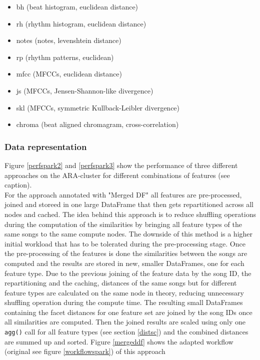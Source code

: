 \begin{itemize}
	\setlength\itemsep{-0.5em}
	\item bh (beat histogram, euclidean distance)
	\item rh (rhythm histogram, euclidean distance)
	\item notes (notes, levenshtein distance)
	\item rp (rhythm patterns, euclidean)
	\item mfcc (MFCCs, euclidean distance)
	\item js (MFCCs, Jensen-Shannon-like divergence)
	\item skl (MFCCs, symmetric Kullback-Leibler divergence)
	\item chroma (beat aligned chromagram, cross-correlation)
\end{itemize}

\subsubsection{Data representation}

Figure \ref {perfspark2} and \ref{perfspark3} show the performance of three different approaches on the ARA-cluster for different combinations of features (see caption).\\
For the approach annotated with "Merged DF" all features are pre-processed, joined and storeed in one large DataFrame that then gets repartitioned across all nodes and cached. The idea behind this approach is to reduce shuffling operations during the computation of the similarities by bringing all feature types of the same songs to the same compute nodes. The downside of this method is a higher initial workload that has to be tolerated during the pre-processing stage. Once the pre-processing of the features is done the similarities between the songs are computed and the results are stored in new, smaller DataFrames, one for each feature type. Due to the previous joining of the feature data by the song ID, the repartitioning and the caching, distances of the same songs but for different feature types are calculated on the same node in theory, reducing unnecessary shuffling operation during the compute time. The resulting small DataFrames containing the facet distances for one feature set are joined by the song IDs once all similarities are computed. Then the joined results are scaled using only one \lstinline{agg()} call for all feature types (see section \ref{distsc}) and the combined distances are summed up and sorted. Figure \ref{mergeddf} shows the adapted workflow (original see figure \ref{workflowspark}) of this approach \\

